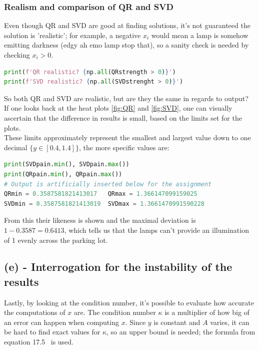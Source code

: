 \documentclass[12pt]{article}
\begin{document}
\subsubsection*{Realism and comparison of QR and SVD}
Even though QR and SVD are good at finding solutions, it's not guaranteed the solution is 'realistic'; for example, a negative $x_i$ would mean a lamp is somehow emitting darkness (edgy ah emo lamp stop that), so a sanity check is needed by checking $x_i > 0$.
\begin{lstlisting}[language=Python] 
print(f'QR realistic? {np.all(QRstrength > 0)}')
print(f'SVD realistic? {np.all(SVDstrenght > 0)}')
\end{lstlisting}
So both QR and SVD are realistic, but are they the same in regards to output?\\
If one looks back at the heat plots \ref{fig:QR} and \ref{fig:SVD}, one can visually ascertain that the difference in results is small, based on the limits set for the plots.\\
These limits approximately represent the smallest and largest value down to one decimal $\{y \in [0.4, 1.4]\}$, the more specific values are:
\begin{lstlisting}[language=Python]
print(SVDpain.min(), SVDpain.max())
print(QRpain.min(), QRpain.max())
# Output is artificially inserted below for the assignment
QRmin = 0.3587581821413017   QRmax = 1.366147099159025
SVDmin = 0.3587581821413019  SVDmax = 1.3661470991590228
\end{lstlisting}
From this their likeness is shown and the maximal deviation is $1 - 0.3587 = 0.6413$, which tells us that the lamps can't provide an illumination of 1 evenly across the parking lot. 

\subsection*{(e) - Interrogation for the instability of the results}
Lastly, by looking at the condition number, it's possible to evaluate how accurate the computations of $x$ are. The condition number $\kappa$ is a multiplier of how big of an error can happen when computing $x$.
Since $y$ is constant and $A$ varies, it can be hard to find exact values for $\kappa$, so an upper bound is needed; the formula from equation 17.5~\cite{NUMLA} is used.\\\\
\end{document}
